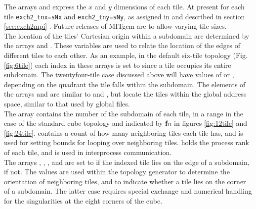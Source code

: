 The arrays  and
 express the $x$ and $y$ dimensions of
each tile.  At present for each tile \texttt{exch2\_tnx=sNx} and
\texttt{exch2\_tny=sNy}, as assigned in  and described in
section \ref{sec:exch2mpi} .  Future releases of MITgcm are to allow varying tile
sizes. \\

The location of the tiles' Cartesian origin within a subdomain are
determined by the arrays  and
.  These variables are used to
relate the location of the edges of different tiles to each other.  As
an example, in the default six-tile topology (Fig. \ref{fig:6tile})
each index in these arrays is set to  since a tile occupies
its entire subdomain.  The twentyfour-tile case discussed above will
have values of  or , depending on the quadrant the
tile falls within the subdomain.  The elements of the arrays
 and
 are similar to
 and
, but locate the tiles within the
global address space, similar to that used by global files. \\

The array  contains the number of
the subdomain of each tile, in a range  in the case of the
standard cube topology and indicated by \textbf{\textsf{f}}$n$ in
figures \ref{fig:12tile} and
\ref{fig:24tile}. 
contains a count of how many neighboring tiles each tile has, and is
used for setting bounds for looping over neighboring tiles.
 holds the process rank of each
tile, and is used in interprocess communication.  \\


The arrays ,
,
, and
 are set to  if the
indexed tile lies on the edge of a subdomain,  if not.  The
values are used within the topology generator to determine the
orientation of neighboring tiles, and to indicate whether a tile lies
on the corner of a subdomain.  The latter case requires special
exchange and numerical handling for the singularities at the eight
corners of the cube. \\



